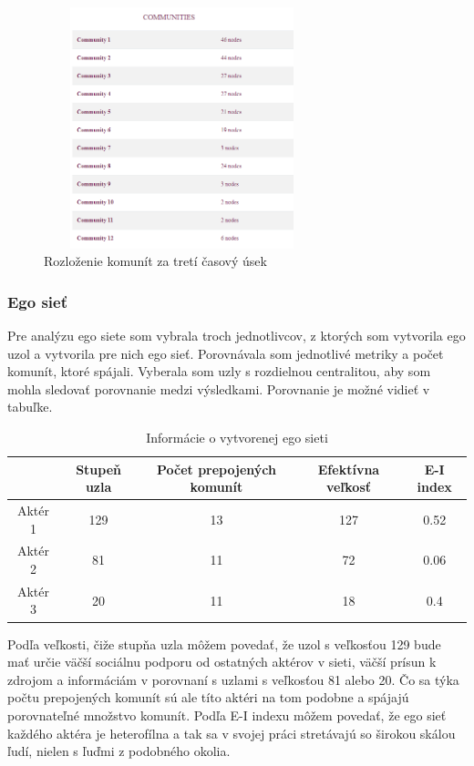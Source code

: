 \documentclass[slovak,master,public,dept460,male,cpdeclaration,oneside]{diploma}
\begin{document}
\begin{figure}[H]
\centering
\includegraphics[width=8cm, height=7cm]{figures/team_communities_tab_third}
\caption{Rozloženie komunít za tretí časový úsek}
\label{team_communities_third}
\end{figure}



\subsubsection{Ego sieť}
Pre analýzu ego siete som vybrala troch jednotlivcov, z ktorých som vytvorila ego uzol a vytvorila pre nich ego sieť. Porovnávala som jednotlivé metriky a počet komunít, ktoré spájali. Vyberala som uzly s rozdielnou centralitou, aby som mohla sledovať porovnanie medzi výsledkami. Porovnanie je možné vidieť v tabuľke.

\begin{table}[h!]
\centering
\begin{tabular}{ |c|c|c|c|c| }
 \hline
  & Stupeň uzla & Počet prepojených komunít & Efektívna veľkosť & E-I index \\ 
 \hline
 Aktér 1    & 129  & 13  & 127  &  0.52 \\  
  \hline
 Aktér 2 &  81  &  11 & 72 & 0.06  \\ 
  \hline
 Aktér 3   & 20   &  11 &  18 & 0.4  \\ 
  \hline

\end{tabular}
\caption{Informácie o vytvorenej ego sieti}
\end{table} 


Podľa veľkosti, čiže stupňa uzla môžem povedať, že uzol s veľkosťou 129 bude mať určie väčší sociálnu podporu od ostatných aktérov v sieti, väčší prísun k zdrojom a informáciám v porovnaní s uzlami s veľkosťou 81 alebo 20. Čo sa týka počtu prepojených komunít sú ale títo aktéri na tom podobne a spájajú porovnateľné množstvo komunít. Podľa E-I indexu môžem povedať, že ego sieť každého aktéra je heterofílna a tak sa v svojej práci stretávajú so širokou skálou ľudí, nielen s ľuďmi z podobného okolia.
\end{document}
